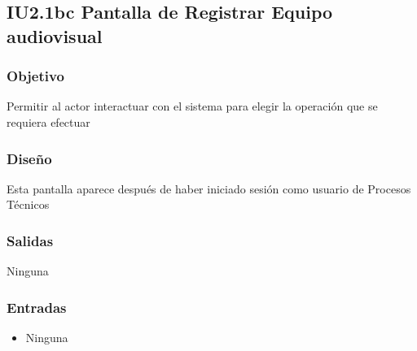 \newpage
\subsection{IU2.1bc Pantalla de Registrar Equipo audiovisual}

\subsubsection{Objetivo}
	Permitir al actor interactuar con el sistema para elegir la operación que se requiera efectuar

\subsubsection{Diseño}
	Esta pantalla aparece después de haber iniciado sesión como usuario de Procesos Técnicos 


\subsubsection{Salidas}
	\begin{Citemize}
	        \item Ninguna
	\end{Citemize}
	
\subsubsection{Entradas}
		\begin{itemize}
        	\item Ninguna
        \end{itemize}  